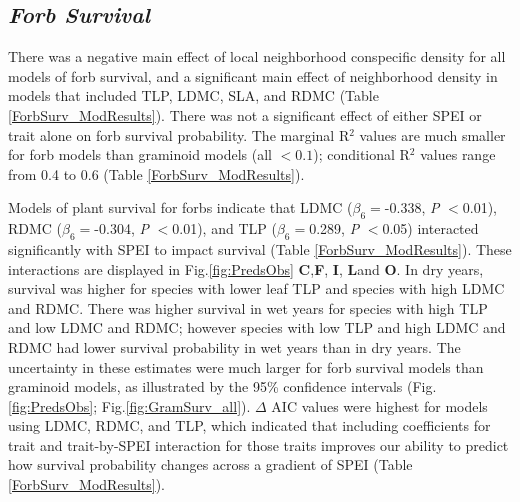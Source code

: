 \documentclass[12pt, letterpaper]{article}
\begin{document}
\subsection{\textit{Forb Survival}} There was a negative main effect of local neighborhood conspecific density for all models of forb survival, and a significant main effect of neighborhood density in models that included TLP, LDMC, SLA, and RDMC (Table \ref{ForbSurv_ModResults}). There was not a significant effect of either SPEI or trait alone on forb survival probability. The marginal R$^2$ values are much smaller for forb models than graminoid models (all $<0.1$);  conditional R$^2$ values range from 0.4 to 0.6 (Table \ref{ForbSurv_ModResults}).

Models of plant survival for forbs indicate that LDMC ($\beta_6=$-0.338,  \textit{P} $<$0.01), RDMC ($\beta _6=$-0.304,  \textit{P} $<$0.01), and TLP ($\beta _6=$0.289,  \textit{P} $<$0.05) interacted significantly with SPEI to impact survival (Table \ref{ForbSurv_ModResults}). These interactions are displayed in Fig.\ref{fig:PredsObs} \textbf{C},\textbf{F}, \textbf{I}, \textbf{L}and \textbf{O}. In dry years, survival was higher for species with lower leaf TLP and species with high LDMC and RDMC. There was higher survival in wet years for species with high TLP and low LDMC and RDMC; however species with low TLP and high LDMC and RDMC had lower survival probability in wet years than in dry years. The  uncertainty in these estimates were much larger for forb survival models than graminoid models, as illustrated by the 95\% confidence intervals (Fig.\ref{fig:PredsObs}; Fig.\ref{fig:GramSurv_all}). $\Delta$ AIC values were highest for models using LDMC, RDMC, and TLP, which indicated that including coefficients for trait and trait-by-SPEI interaction for those traits improves our ability to predict how survival probability changes across a gradient of SPEI (Table \ref{ForbSurv_ModResults}). 
\end{document}
